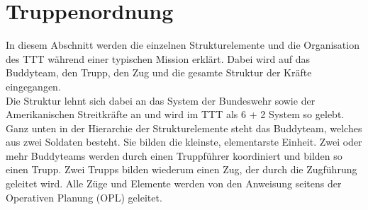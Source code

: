 \section{Truppenordnung}
	In diesem Abschnitt werden die einzelnen Strukturelemente und die Organisation des \ac{TTT} während einer typischen Mission erklärt. Dabei wird auf das Buddyteam, den Trupp, den Zug und die gesamte Struktur der Kräfte eingegangen.\\
	Die Struktur lehnt sich dabei an das System der Bundeswehr sowie der Amerikanischen Streitkräfte an und wird im \ac{TTT} als 6 + 2 System so gelebt.\\
	Ganz unten in der Hierarchie der Strukturelemente steht das Buddyteam, welches aus zwei Soldaten besteht. Sie bilden die kleinste, elementarste Einheit. Zwei oder mehr Buddyteams werden durch einen Truppführer koordiniert und bilden so einen Trupp. Zwei Trupps bilden wiederum einen Zug, der durch die Zugführung geleitet wird. Alle Züge und Elemente werden von den Anweisung seitens der Operativen Planung (\ac{OPL}) geleitet.  










